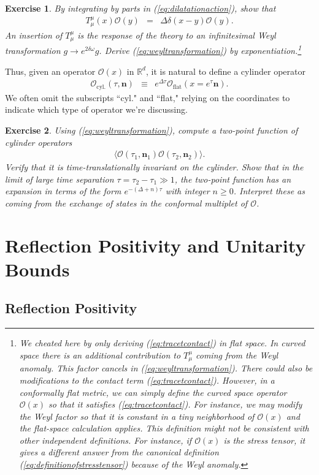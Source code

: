 \documentclass[11pt]{ws-rv9x6}
\newcommand\be{\begin{eqnarray}}
\newcommand\ee{\end{eqnarray}}
\newcommand\cO{\mathcal{O}}
\newcommand\<\langle
\renewcommand\>\rangle
\newcommand\de\delta
\newcommand\R{\mathbb{R}}
\renewcommand\.{\cdot}
\newcommand\De{\Delta}
\newcommand\bn{\mathbf{n}}
\newtheorem{exercise}{Exercise}[section]
\begin{document}
\begin{exercise}
By integrating by parts in (\ref{eq:dilatationaction}), show that 
\be
\label{eq:tracetcontact}
T_\mu^\mu(x) \cO(y) &=& \De \de(x-y)\cO(y).
\ee
An insertion of $T_\mu^\mu$ is the response of the theory to an infinitesimal Weyl transformation $g\to e^{2\de\omega} g$. Derive (\ref{eq:weyltransformation}) by exponentiation.\footnote{We cheated here by only deriving (\ref{eq:tracetcontact}) in flat space.  In curved space there is an additional contribution to $T_\mu^\mu$ coming from the Weyl anomaly.  This factor cancels in (\ref{eq:weyltransformation}). There could also be modifications to the contact term (\ref{eq:tracetcontact}). However, in a conformally flat metric, we can simply define the curved space operator $\cO(x)$ so that it satisfies (\ref{eq:tracetcontact}). For instance, we may modify the Weyl factor so that it is constant in a tiny neighborhood of $\cO(x)$ and the flat-space calculation applies. This definition might not be consistent with other independent definitions. For instance, if $\cO(x)$ is the stress tensor, it gives a different answer from the canonical definition (\ref{eq:definitionofstresstensor}) because of the Weyl anomaly.}
\end{exercise}

Thus, given an operator $\cO(x)$ in $\R^d$, it is natural to define a cylinder operator
\be
\label{eq:definitionofcylinderop}
\cO_\mathrm{cyl.}(\tau,\bn) &\equiv& e^{\De \tau} \cO_\mathrm{flat}(x=e^\tau \bn).
\ee
We often omit the subscripts ``cyl." and ``flat," relying on the coordinates to indicate which type of operator we're discussing.
\begin{exercise}
Using (\ref{eq:weyltransformation}), compute a two-point function of cylinder operators
\be
\<\cO(\tau_1,\bn_1)\cO(\tau_2,\bn_2)\>.
\ee
Verify that it is time-translationally invariant on the cylinder. Show that in the limit of large time separation $\tau=\tau_2-\tau_1 \gg 1$, the two-point function has an expansion in terms of the form $e^{-(\De+n)\tau}$ with integer $n\geq 0$.  Interpret these as coming from the exchange of states in the conformal multiplet of $\cO$.
\end{exercise}

\section{Reflection Positivity and Unitarity Bounds}

\subsection{Reflection Positivity}
\label{sec:reflectionpositivity}
\end{document}
